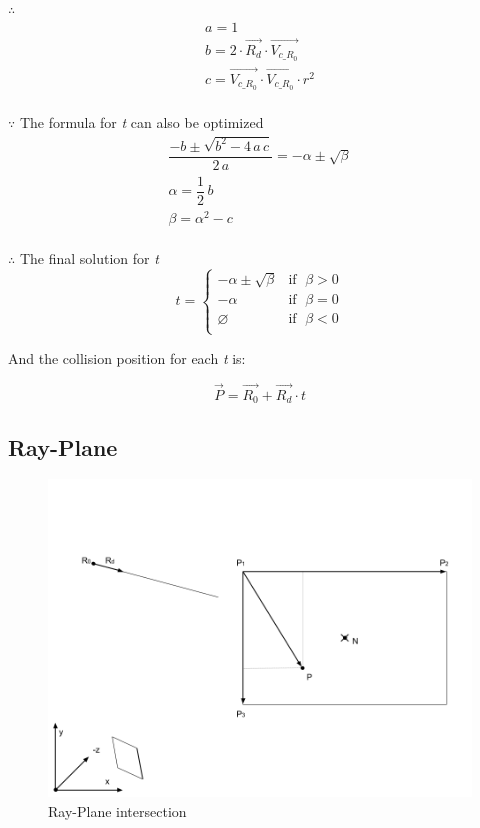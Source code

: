 $\therefore$
\[
\begin{array}{lr}
a =1\\
b = 2 \cdot \overrightarrow{R_d} \cdot \overrightarrow{V_{c\_R_0}}\\
c = \overrightarrow{V_{c\_R_0}} \cdot \overrightarrow{V_{c\_R_0}} \cdot r^2\\
\end{array}
\]

$\because$ The formula for \emph{t} can also be optimized
\[
\begin{array}{lr}
\dfrac{-b \pm \sqrt{b^2 - 4\,a\,c}}{2\,a} = -\alpha \pm \sqrt{\beta}\\
\alpha = \dfrac{1}{2}\,b\\
\beta = \alpha^2 - c\\
\end{array}
\]

$\therefore$ The final solution for \emph{t}
\[
t =
\begin{cases}
 -\alpha \pm \sqrt{\beta} & \text{if }\;\beta > 0\\
-\alpha & \text{if }\;\beta = 0\\
\varnothing & \text{if }\;\beta < 0\\
\end{cases}
\]

And the collision position for each \emph{t} is:

\[
\overrightarrow{P} = \overrightarrow{R_0} + \overrightarrow{R_d} \cdot t
\]

\subsection{Ray-Plane}

\begin{figure}[H]
\caption{Ray-Plane intersection}
\label{fig:ray-plane}
\centering
\includegraphics[width=\linewidth]{Figures/ray-plane-intersection.png}
\decoRule
\end{figure}

